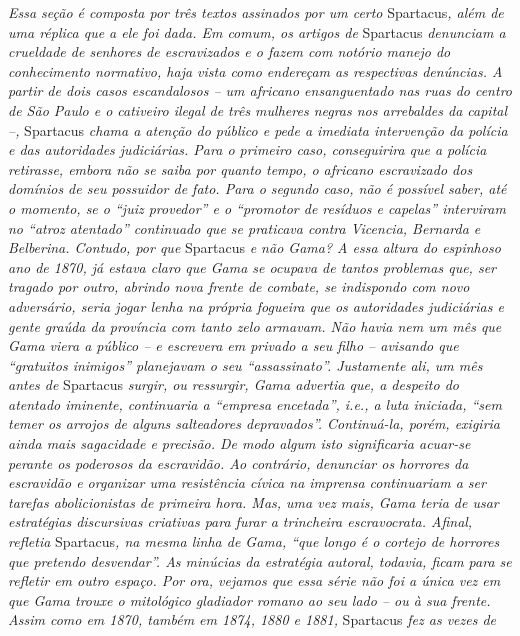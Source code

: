\begin{argumento}
\emph{Essa seção é composta por três textos assinados por um certo}
Spartacus\emph{, além de uma réplica que a ele foi dada. Em comum, os
artigos de} Spartacus \emph{denunciam a crueldade de senhores de
escravizados e o fazem com notório manejo do conhecimento normativo,
haja vista como endereçam as respectivas denúncias. A partir de dois
casos escandalosos -- um africano ensanguentado nas ruas do centro de
São Paulo e o cativeiro ilegal de três mulheres negras nos arrebaldes da
capital --,} Spartacus \emph{chama a atenção do público e pede a
imediata intervenção da polícia e das autoridades judiciárias. Para o
primeiro caso, conseguirira que a polícia retirasse, embora não se saiba
por quanto tempo, o africano escravizado dos domínios de seu possuidor
de fato. Para o segundo caso, não é possível saber, até o momento, se o
``juiz provedor'' e o ``promotor de resíduos e capelas'' interviram no
``atroz atentado'' continuado que se praticava contra Vicencia, Bernarda e
Belberina. Contudo, por que} Spartacus \emph{e não Gama? A essa altura
do espinhoso ano de 1870, já estava claro que Gama se ocupava de tantos
problemas que, ser tragado por outro, abrindo nova frente de combate, se
indispondo com novo adversário, seria jogar lenha na própria fogueira
que os autoridades judiciárias e gente graúda da província com tanto
zelo armavam. Não havia nem um mês que Gama viera a público -- e
escrevera em privado a seu filho -- avisando que ``gratuitos inimigos''
planejavam o seu ``assassinato''. Justamente ali, um mês antes de}
Spartacus \emph{surgir, ou ressurgir, Gama advertia que, a despeito do
atentado iminente, continuaria a ``empresa encetada'', i.e., a luta
iniciada, ``sem temer os arrojos de alguns salteadores depravados''.
Continuá-la, porém, exigiria ainda mais sagacidade e precisão. De modo
algum isto significaria acuar-se perante os poderosos da escravidão. Ao
contrário, denunciar os horrores da escravidão e organizar uma
resistência cívica na imprensa continuariam a ser tarefas abolicionistas
de primeira hora. Mas, uma vez mais, Gama teria de usar estratégias
discursivas criativas para furar a trincheira escravocrata. Afinal,
refletia} Spartacus\emph{, na mesma linha de Gama, ``que longo é o
cortejo de horrores que pretendo desvendar''. As minúcias da estratégia
autoral, todavia, ficam para se refletir em outro espaço. Por ora,
vejamos que essa série não foi a única vez em que Gama trouxe o
mitológico gladiador romano ao seu lado -- ou à sua frente. Assim como
em 1870, também em 1874, 1880 e 1881,} Spartacus \emph{fez as vezes de
}
\end{argumento}
